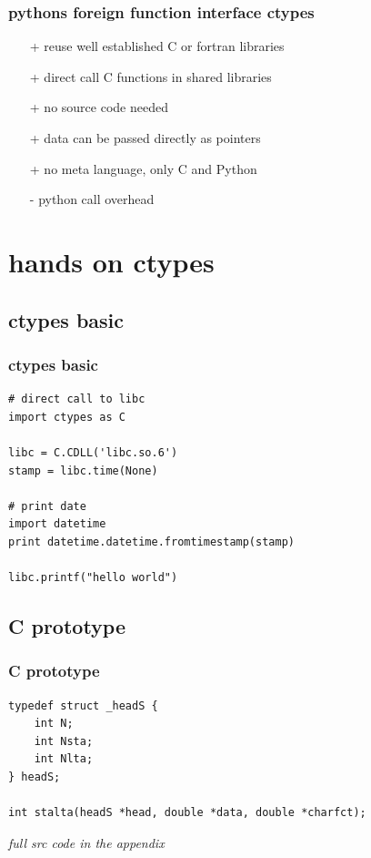 \documentclass[utf8, compress, hyperref={pdftex=true,pdfpagemode=FullScreen}, graphicx={pdftex}]{beamer}
\begin{document}
\begin{frame}
    \frametitle{pythons foreign function interface ctypes}
    \begin{itemize}
        \item[+] reuse well established C or fortran libraries
        \item[+] direct call C functions in shared libraries
        \item[+] no source code needed
        \item[+] data can be passed directly as pointers
        \item[+] no meta language, only C and Python
        \item[-] python call overhead
    \end{itemize}
\end{frame}

\section{hands on ctypes}
\subsection[basics]{ctypes basic}
\begin{frame}[fragile]
    \frametitle{ctypes basic}
    \begin{lstlisting}
# direct call to libc
import ctypes as C

libc = C.CDLL('libc.so.6')
stamp = libc.time(None)

# print date
import datetime
print datetime.datetime.fromtimestamp(stamp)

libc.printf("hello world")
    \end{lstlisting}
\end{frame}

\subsection[C]{C prototype}
\begin{frame}[fragile]
    \frametitle{C prototype}
    \begin{lstlisting}
typedef struct _headS {
    int N;
    int Nsta;
    int Nlta;
} headS;

int stalta(headS *head, double *data, double *charfct);
    \end{lstlisting}
    \vfill
    \textit{full src code in the appendix}
\end{frame}
\end{document}
